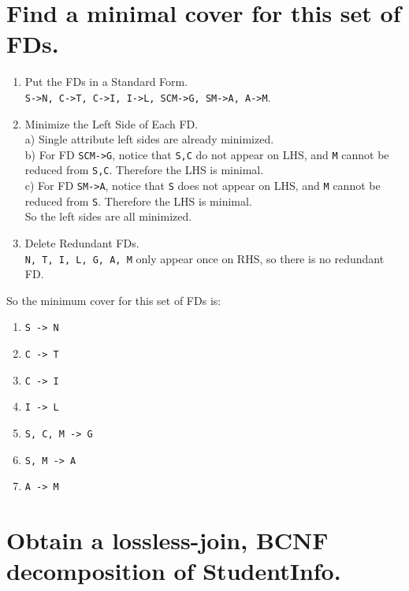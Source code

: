 \documentclass{article}
\begin{document}
\section{Find a minimal cover for this set of FDs.}

\begin{enumerate}
\item Put the FDs in a Standard Form.\\
	\texttt{S->N, C->T, C->I, I->L, SCM->G, SM->A, A->M}.
\item Minimize the Left Side of Each FD.\\
	a) Single attribute left sides are already minimized.\\
	b) For FD \texttt{SCM->G}, notice that \texttt{S,C} do not appear on LHS, and \texttt{M} cannot be reduced from \texttt{S,C}. Therefore the LHS is minimal. \\
	c) For FD \texttt{SM->A}, notice that \texttt{S} does not appear on LHS, and \texttt{M} cannot be reduced from \texttt{S}. Therefore the LHS is minimal. \\
	So the left sides are all minimized.
\item Delete Redundant FDs.\\
	\texttt{N, T, I, L, G, A, M} only appear once on RHS, so there is no redundant FD.
\end{enumerate}
So the minimum cover for this set of FDs is:
	\begin{enumerate}
		\item \texttt{S -> N}
		\item \texttt{C -> T}
		\item \texttt{C -> I}
		\item \texttt{I -> L}
		\item \texttt{S, C, M -> G}
		\item \texttt{S, M -> A}
		\item \texttt{A -> M}
	\end{enumerate}

\section{Obtain a lossless-join, BCNF decomposition of StudentInfo.}
\end{document}
